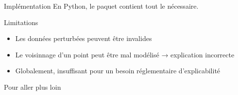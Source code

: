 \begin{frame}{Implémentation}
  En Python, le paquet  contient tout le nécessaire.
\end{frame}

\begin{frame}{Limitations}
  \begin{itemize}
    \item Les données perturbées peuvent être invalides
    \item Le voisinnage d'un point peut être mal modélisé → explication incorrecte
    \item Globalement, insuffisant pour un besoin réglementaire d'explicabilité
  \end{itemize}
\end{frame}

\begin{frame}{Pour aller plus loin}
\end{frame}
